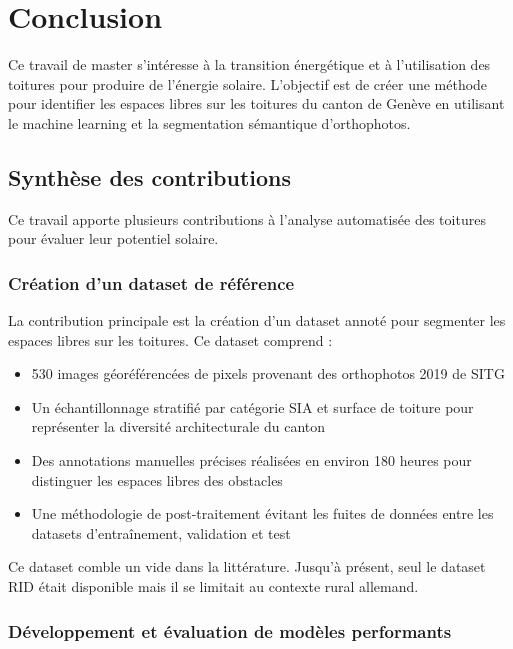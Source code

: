 \chapter{Conclusion}
\label{chap:conclusion}

Ce travail de master s'intéresse à la transition énergétique et à l'utilisation des toitures pour produire de l'énergie solaire. L'objectif est de créer une méthode pour identifier les espaces libres sur les toitures du canton de Genève en utilisant le machine learning et la segmentation sémantique d'orthophotos.


\localtableofcontents

\newpage

\section{Synthèse des contributions}

Ce travail apporte plusieurs contributions à l'analyse automatisée des toitures pour évaluer leur potentiel solaire.

\subsection{Création d'un dataset de référence}

La contribution principale est la création d'un dataset annoté pour segmenter les espaces libres sur les toitures. Ce dataset comprend :

\begin{itemize}
    \item 530 images géoréférencées de \si{} pixels provenant des orthophotos 2019 de SITG
    \item Un échantillonnage stratifié par catégorie SIA et surface de toiture pour représenter la diversité architecturale du canton
    \item Des annotations manuelles précises réalisées en environ 180 heures pour distinguer les espaces libres des obstacles
    \item Une méthodologie de post-traitement évitant les fuites de données entre les datasets d'entraînement, validation et test
\end{itemize}

Ce dataset comble un vide dans la littérature. Jusqu'à présent, seul le dataset RID était disponible mais il se limitait au contexte rural allemand.

\subsection{Développement et évaluation de modèles performants}

